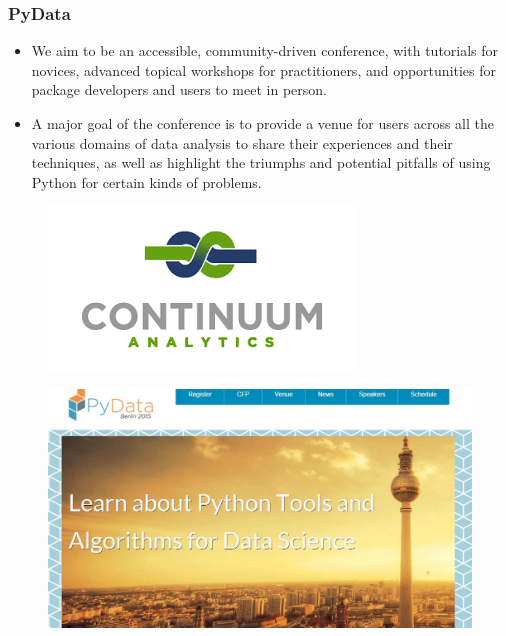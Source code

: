 \documentclass[MASTER.tex]{subfiles}
\begin{document}
\begin{frame}
	\large
	\frametitle{PyData}
	\large
	\begin{itemize}
		\item We aim to be an accessible, community-driven conference, with tutorials for novices, advanced topical workshops for practitioners, and opportunities for package developers and users to meet in person.
		
		\item A major goal of the conference is to provide a venue for users across all the various domains of data analysis to share their experiences and their techniques, as well as highlight the triumphs and potential pitfalls of using Python for certain kinds of problems.
	\end{itemize}
\end{frame}
\begin{frame}
\begin{figure}
\centering
\includegraphics[width=1.0\linewidth]{continuum}
\end{figure}
	\end{frame}
	\begin{frame}\begin{figure}
\centering
\includegraphics[width=1.05\linewidth]{pydataberlin}

\end{figure}
	\end{frame}
\end{document}
